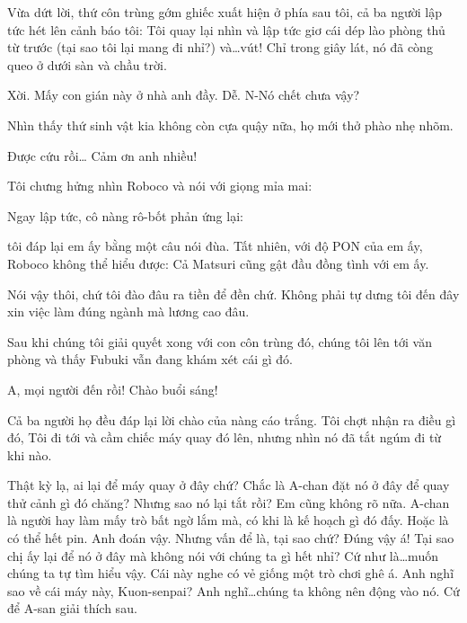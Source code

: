 \documentclass[../main.tex]{subfiles}
\begin{document}
Vừa dứt lời, thứ côn trùng gớm ghiếc xuất hiện ở phía sau tôi, cả ba người lập tức hét lên cảnh báo tôi:  Tôi quay lại nhìn và lập tức giơ cái dép lào phòng thủ từ trước (tại sao tôi lại mang đi nhỉ?) và\ldots vút! Chỉ trong giây lát, nó đã còng queo ở dưới sàn và chầu trời.

\begin{dialogue}
 Xời. Mấy con gián này ở nhà anh đầy. Dễ.
 N-Nó chết chưa vậy?
\end{dialogue}

Nhìn thấy thứ sinh vật kia không còn cựa quậy nữa, họ mới thở phào nhẹ nhõm.

\begin{dialogue}
     Được cứu rồi\ldots
     Cảm ơn anh nhiều!
\end{dialogue}
    
Tôi chưng hửng nhìn Roboco và nói với giọng mỉa mai:     

Ngay lập tức, cô nàng rô-bốt phản ứng lại: 

 tôi đáp lại em ấy bằng một câu nói đùa. Tất nhiên, với độ PON của em ấy, Roboco không thể hiểu được:  Cả Matsuri cũng gật đầu đồng tình với em ấy.
    
Nói vậy thôi, chứ tôi đào đâu ra tiền để đền chứ. Không phải tự dưng tôi đến đây xin việc làm đúng ngành mà lương cao đâu.

Sau khi chúng tôi giải quyết xong với con côn trùng đó, chúng tôi lên tới văn phòng và thấy Fubuki vẫn đang khám xét cái gì đó. 
\begin{dialogue}
 A, mọi người đến rồi! Chào buổi sáng!
\end{dialogue}
Cả ba người họ đều đáp lại lời chào của nàng cáo trắng. 
Tôi chợt nhận ra điều gì đó,  Tôi đi tới và cầm chiếc máy quay đó lên, nhưng nhìn nó đã tắt ngúm đi từ khi nào. 

\begin{dialogue}
 Thật kỳ lạ, ai lại để máy quay ở đây chứ?
 Chắc là A-chan đặt nó ở đây để quay thử cảnh gì đó chăng? Nhưng sao nó lại tắt rồi?
 Em cũng không rõ nữa. A-chan là người hay làm mấy trò bất ngờ lắm mà, có khi là kế hoạch gì đó đấy.
 Hoặc là có thể hết pin. Anh đoán vậy. Nhưng vấn để là, {\color{blue}tại sao chứ?}
 Đúng vậy á! Tại sao chị ấy lại để nó ở đây mà không nói với chúng ta gì hết nhỉ? Cứ như là\ldots muốn chúng ta tự tìm hiểu vậy.
 Cái này nghe có vẻ giống một trò chơi ghê á.
 Anh nghĩ sao về cái máy này, Kuon-senpai?
 Anh nghĩ\ldots chúng ta không nên động vào nó. Cứ để A-san giải thích sau.
\end{dialogue}
\end{document}
